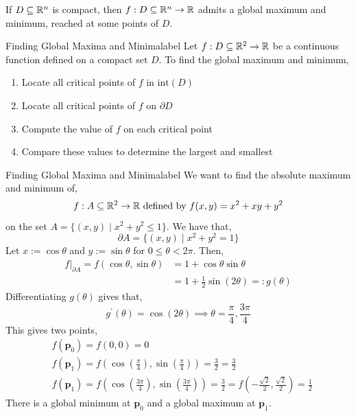 \begin{thm}
 If $D \subseteq \mathbb{R}^n$ is compact, then $f: D \subseteq \mathbb{R}^n \rightarrow \mathbb{R}$ admits a global maximum and minimum, reached at some points of $D$.
\end{thm}

\begin{ex}{Finding Global Maxima and Minima}{label}
    Let $f: D \subseteq \mathbb{R}^2 \rightarrow \mathbb{R}$ be a continuous function defined on a compact set $D$. To find the global maximum and minimum,
    \begin{enumerate}
        \item Locate all critical points of $f$ in $\text{int}(D)$
        \item Locate all critical points of $f$ on $\partial D$
        \item Compute the value of $f$ on each critical point
        \item Compare these values to determine the largest and smallest
    \end{enumerate}
\end{ex}

\begin{ex}{Finding Global Maxima and Minima}{label}
    We want to find the absolute maximum and minimum of,
    \[f: A \subseteq \mathbb{R}^2 \rightarrow \mathbb{R} \text{ defined by } f(x,y) = x^2 + xy + y^2\]
    on the set $A = \{(x,y) \mid x^2+y^2 \leq 1\}$. We have that,
    \[\partial A = \{(x,y) \mid x^2+y^2 = 1\}\]
    Let $x := \cos \theta$ and $y := \sin \theta$ for $0 \leq \theta < 2 \pi$. Then,
    \begin{align*}
        \left. f\right|_{\partial A} = f(\cos \theta, \sin \theta) &= 1 + \cos \theta \sin \theta \\
        &= 1 + \frac{1}{2} \sin (2 \theta) =: g(\theta)
    \end{align*}
    Differentiating $g(\theta)$ gives that,
    \[g^{\prime}(\theta) = \cos (2 \theta) \implies \theta = \frac{\pi}{4}, \frac{3\pi}{4}\]
    This gives two points,
    \begin{align*}
        &f(\mathbf{p}_0) = f(0,0) = 0 \\
        &f\left(\mathbf{p}_1\right)=f\left(\cos \left(\frac{\pi}{4}\right), \sin \left(\frac{\pi}{4}\right)\right)=\frac{3}{2} = \frac{3}{2} \\
        &f\left(\mathbf{p}_1\right)=f\left(\cos \left(\frac{3\pi}{4}\right), \sin \left(\frac{3\pi}{4}\right)\right)=\frac{3}{2} = f\left(-\frac{\sqrt{2}}{2}, \frac{\sqrt{2}}{2}\right) = \frac{1}{2}
    \end{align*}
    There is a global minimum at $\mathbf{p}_0$ and a global maximum at $\mathbf{p}_1$.
\end{ex}

